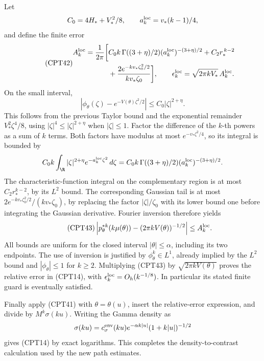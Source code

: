 \documentclass[11pt,a4paper]{article}
\begin{document}
Let
\[
 C_0=4H_*+V_*^2/8,\qquad a_k^{\rm loc}=v_*(k-1)/4,
\]
and define the finite error
\begin{equation}\tag{CPT42}
\begin{split}
 A_k^{\rm loc}=\frac1{2\pi}\bigg[
 &C_0k\,\Gamma((3+\eta)/2)
                    (a_k^{\rm loc})^{-(3+\eta)/2}
 +C_2r_*^{\,k-2}\\
 &+\frac{2e^{-kv_*\zeta_0^2/2}}{kv_*\zeta_0}
 \bigg],\qquad
 \epsilon_k^{\rm loc}=\sqrt{2\pi kV_*}\,A_k^{\rm loc}.
\end{split}
\end{equation}
On the small interval,
\[
 |\phi_\theta(\zeta)-e^{-V(\theta)\zeta^2/2}|
 \le C_0|\zeta|^{2+\eta}.
\]
This follows from the previous Taylor bound and the exponential
remainder \(V_*^2\zeta^4/8\), using
\(|\zeta|^4\le|\zeta|^{2+\eta}\) when \(|\zeta|\le1\).
Factor the difference of the \(k\)-th powers as a sum of \(k\)
terms.  Both factors have modulus at most
\(e^{-v_*\zeta^2/4}\), so its integral is bounded by
\[
 C_0k\int_\R|\zeta|^{2+\eta}
             e^{-a_k^{\rm loc}\zeta^2}\,d\zeta
 =C_0k\,\Gamma((3+\eta)/2)
                      (a_k^{\rm loc})^{-(3+\eta)/2}.
\]
The characteristic-function integral on the complementary
region is at most \(C_2r_*^{k-2}\), by its \(L^2\) bound.
The corresponding Gaussian tail is at most
\(2e^{-kv_*\zeta_0^2/2}/(kv_*\zeta_0)\), by replacing
the factor \(|\zeta|/\zeta_0\) with its lower bound one
before integrating the Gaussian derivative.
Fourier inversion therefore yields
\begin{equation}\tag{CPT43}
 \left|p_\theta^{*k}(k\mu(\theta))
           -(2\pi kV(\theta))^{-1/2}\right|
 \le A_k^{\rm loc}.
\end{equation}
All bounds are uniform for the closed interval
\(|\theta|\le\alpha\), including its two endpoints.
The use of inversion is justified by
\(\phi_\theta^k\in L^1\), already implied by the \(L^2\)
bound and \(|\phi_\theta|\le1\) for \(k\ge2\).
Multiplying (CPT43) by \(\sqrt{2\pi kV(\theta)}\) proves
the relative error in (CPT14), with
\(\epsilon_k^{\rm loc}=O_h(k^{-1/8})\).
In particular its stated finite guard is eventually satisfied.

Finally apply (CPT41) with \(\theta=\theta(u)\),
insert the relative-error expression, and divide by
\(M^k\sigma(ku)\).  Writing the Gamma density as
\[
 \sigma(ku)=c_{\sigma}^{\rm env}(ku)
                 e^{-\alpha k|u|}(1+k|u|)^{-1/2}
\]
gives (CPT14) by exact logarithms.
This completes the density-to-contrast calculation used by
the new path estimates.
\end{document}
